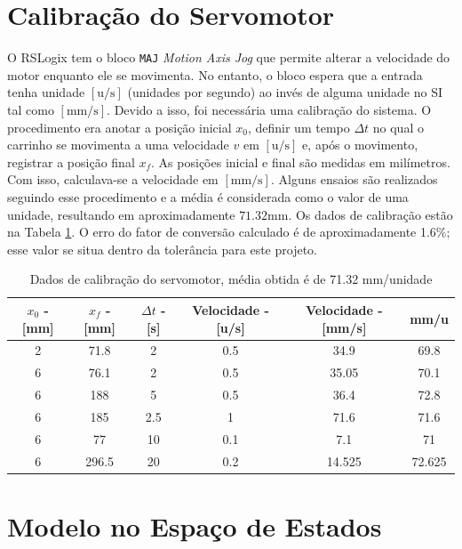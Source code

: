 \section{Calibração do Servomotor\label{calibracaoServomotorSecao}}

O RSLogix tem o bloco \texttt{MAJ} \textendash{} \textit{Motion Axis Jog} \textendash{} que permite alterar a velocidade do motor enquanto ele se movimenta. No entanto, o bloco espera que a entrada tenha unidade $[\mathrm{u}/\mathrm{s}]$ (unidades por segundo) ao invés de alguma unidade no SI tal como $[\mathrm{mm}/\mathrm{s}]$. Devido a isso, foi necessária uma calibração do sistema. O procedimento era anotar a posição inicial $x_0$, definir um tempo $\Delta t$ no qual o carrinho se movimenta a uma velocidade $v$ em $[\mathrm{u}/\mathrm{s}]$ e, após o movimento,  registrar a posição final $x_f$. As posições inicial e final são medidas em milímetros. Com isso, calculava-se a velocidade em $[\mathrm{mm}/\mathrm{s}]$. Alguns ensaios são realizados seguindo esse procedimento e a média é considerada como o valor de uma unidade, resultando em aproximadamente $71.32\mathrm{mm}$. Os dados de calibração estão na Tabela \ref{calibracaoServomotor}. O erro do fator de conversão calculado é de aproximadamente 1.6\%; esse valor se situa dentro da tolerância para este projeto.

\begin{table}[!ht]
\centering
\caption{Dados de calibração do servomotor, média obtida é de 71.32 mm/unidade\label{calibracaoServomotor}}
\begin{tabular}{|c|c|c|c|c|c|}
\hline
	$x_0$ - [mm] & $x_f$ - [mm] & $\Delta t$ - [s] & Velocidade - [u/s] & Velocidade - [mm/s] & mm/u\\ \hline
2 &	71.8  &	2   &	0.5 &	34.9   & 	69.8\\ \hline
6 & 76.1  &	2   &	0.5 &	35.05  &	70.1\\ \hline
6 &	188	  &  5   &	0.5	&   36.4   &	72.8\\ \hline
6 &	185   &	2.5 &	1	& 	71.6   &	71.6\\ \hline
6 &	77    &	10  &	0.1	&   7.1    &	71\\ \hline
6 &	296.5 &	20	&   0.2 & 	14.525 &	72.625\\ \hline\end{tabular}
\end{table}

\section{Modelo no Espaço de Estados}

